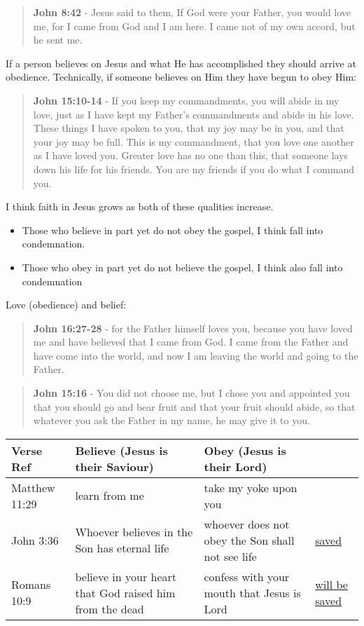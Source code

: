 \documentclass[11pt]{article}
\begin{document}
\begin{quote}
\textbf{John 8:42} - Jesus said to them, If God were your Father, you would love me, for I came from God and I am here. I came not of my own accord, but he sent me.
\end{quote}

If a person believes on Jesus and what He has accomplished they should arrive at obedience. Technically, if someone believes on Him they have begun to obey Him:

\begin{quote}
\textbf{John 15:10-14} - If you keep my commandments, you will abide in my love, just as I have kept my Father's commandments and abide in his love. These things I have spoken to you, that my joy may be in you, and that your joy may be full. This is my commandment, that you love one another as I have loved you. Greater love has no one than this, that someone lays down his life for his friends. You are my friends if you do what I command you.
\end{quote}

I think faith in Jesus grows as both of these qualities increase.

\begin{itemize}
\item Those who believe in part yet do not obey the gospel, I think fall into condemnation.
\item Those who obey in part yet do not believe the gospel, I think also fall into condemnation
\end{itemize}

Love (obedience) and belief:

\begin{quote}
\textbf{John 16:27-28} - for the Father himself loves you, because you have loved me and have believed that I came from God. I came from the Father and have come into the world, and now I am leaving the world and going to the Father.
\end{quote}

\begin{quote}
\textbf{John 15:16} - You did not choose me, but I chose you and appointed you that you should go and bear fruit and that your fruit should abide, so that whatever you ask the Father in my name, he may give it to you.
\end{quote}

\begin{center}
\begin{tabular}{llll}
Verse Ref & Believe (Jesus is their Saviour) & Obey (Jesus is their Lord) & \\[0pt]
\hline
Matthew 11:29 & learn from me & take my yoke upon you & \\[0pt]
John 3:36 & Whoever believes in the Son has eternal life & whoever does not obey the Son shall not see life & \uline{saved}\\[0pt]
Romans 10:9 & believe in your heart that God raised him from the dead & confess with your mouth that Jesus is Lord & \uline{will be saved}\\[0pt]
\end{tabular}
\end{center}
\end{document}
